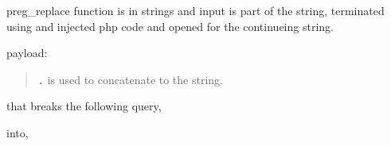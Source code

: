 preg\_replace function is in strings and input is part of the string,
terminated using \texttt{\textquotesingle{}} and injected php code and
opened \texttt{\textquotesingle{}} for the continueing string.

payload:

\begin{Shaded}
\begin{Highlighting}[]
\end{Highlighting}
\end{Shaded}

\begin{quote}
\texttt{.} is used to concatenate to the string.
\end{quote}

that breaks the following query,

\begin{Shaded}
\begin{Highlighting}[]
 \OperatorTok{=}   \NormalTok{(}\StringTok{\textquotesingle{}}\SpecialCharTok{\textbackslash{}\textbackslash{}}\StringTok{\textquotesingle{}}\OtherTok{,}
                \StringTok{\textquotesingle{}}\SpecialCharTok{\textbackslash{}\textbackslash{}\textbackslash{}\textbackslash{}}\StringTok{\textquotesingle{}}\OtherTok{,} \NormalTok{[}\NormalTok{]) }
\StringTok{\textgreater{}}\SpecialCharTok{\textbackslash{}\textbackslash{}\textbackslash{}\textbackslash{}}\SpecialCharTok{\textbackslash{}\textbackslash{}}\OtherTok{;}
\end{Highlighting}
\end{Shaded}

into,

\begin{Shaded}
\begin{Highlighting}[]
 \OperatorTok{=} \SpecialCharTok{\textbackslash{}\textbackslash{}}\StringTok{0\textquotesingle{},\textquotesingle{}}\OtherTok{;}
\end{Highlighting}
\end{Shaded}

